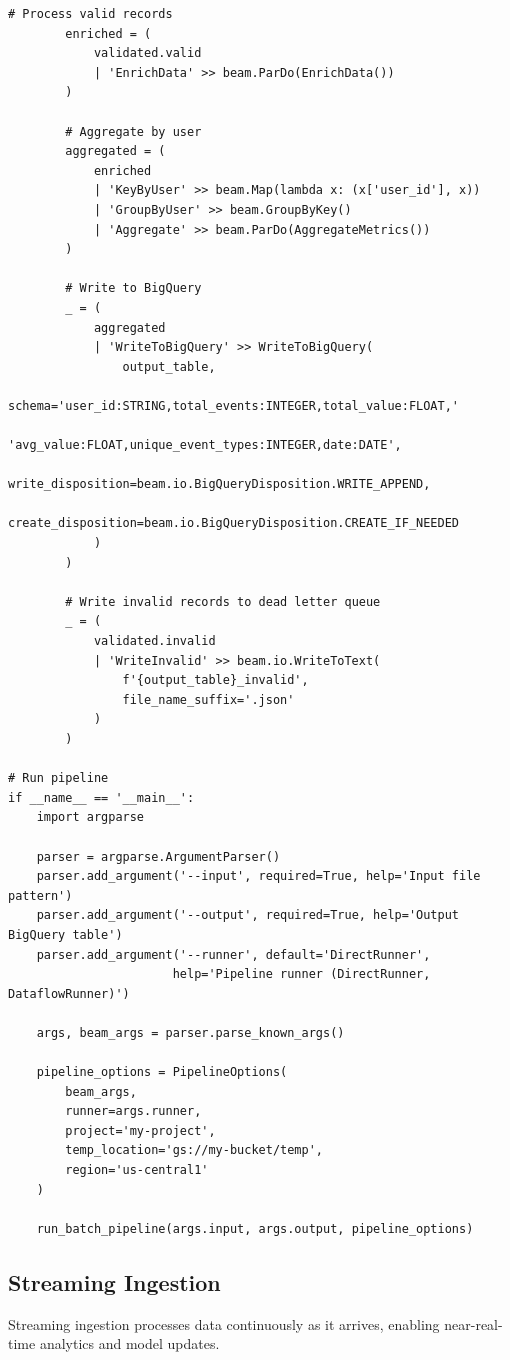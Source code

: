 \begin{lstlisting}[style=python, caption=Batch Data Pipeline with Apache Beam]
        # Process valid records
        enriched = (
            validated.valid
            | 'EnrichData' >> beam.ParDo(EnrichData())
        )

        # Aggregate by user
        aggregated = (
            enriched
            | 'KeyByUser' >> beam.Map(lambda x: (x['user_id'], x))
            | 'GroupByUser' >> beam.GroupByKey()
            | 'Aggregate' >> beam.ParDo(AggregateMetrics())
        )

        # Write to BigQuery
        _ = (
            aggregated
            | 'WriteToBigQuery' >> WriteToBigQuery(
                output_table,
                schema='user_id:STRING,total_events:INTEGER,total_value:FLOAT,'
                       'avg_value:FLOAT,unique_event_types:INTEGER,date:DATE',
                write_disposition=beam.io.BigQueryDisposition.WRITE_APPEND,
                create_disposition=beam.io.BigQueryDisposition.CREATE_IF_NEEDED
            )
        )

        # Write invalid records to dead letter queue
        _ = (
            validated.invalid
            | 'WriteInvalid' >> beam.io.WriteToText(
                f'{output_table}_invalid',
                file_name_suffix='.json'
            )
        )

# Run pipeline
if __name__ == '__main__':
    import argparse

    parser = argparse.ArgumentParser()
    parser.add_argument('--input', required=True, help='Input file pattern')
    parser.add_argument('--output', required=True, help='Output BigQuery table')
    parser.add_argument('--runner', default='DirectRunner',
                       help='Pipeline runner (DirectRunner, DataflowRunner)')

    args, beam_args = parser.parse_known_args()

    pipeline_options = PipelineOptions(
        beam_args,
        runner=args.runner,
        project='my-project',
        temp_location='gs://my-bucket/temp',
        region='us-central1'
    )

    run_batch_pipeline(args.input, args.output, pipeline_options)
\end{lstlisting}

\subsection{Streaming Ingestion}

Streaming ingestion processes data continuously as it arrives, enabling near-real-time analytics and model updates.

